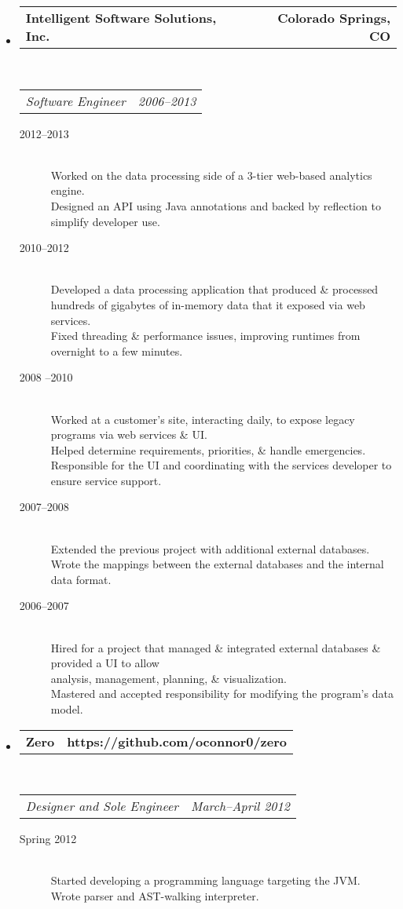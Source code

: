\documentclass[10pt,letterpaper]{article}
\makeatletter
\newcommand{\headerrow}[2]
{\begin{tabular*}{\linewidth}{l@{\extracolsep{\fill}}r}
  #1 &
  #2 \\
\end{tabular*}}
\makeatother
\begin{document}
\begin{itemize}
  \item
  \headerrow
    {\textbf{Intelligent Software Solutions, Inc.}}
    {\textbf{Colorado Springs, CO}}
  \\
  \headerrow
    {\emph{Software Engineer}}
    {\emph{2006--2013}}
  \begin{description}
    \item[2012--2013] \hfill \\
        Worked on the data processing side of a 3-tier web-based analytics engine. \\
        Designed an API using Java annotations and backed by reflection to simplify developer use.
    \item[2010--2012] \hfill \\
        Developed a data processing application that produced \& processed hundreds of gigabytes of in-memory data that it exposed via web services. \\
        Fixed threading \& performance issues, improving runtimes from overnight to a few minutes.
    \item[2008 --2010] \hfill \\
        Worked at a customer’s site, interacting daily, to expose legacy programs via web services \& UI. \\
        Helped determine requirements, priorities, \& handle emergencies. \\
        Responsible for the UI and coordinating with the services developer to ensure service support.
    \item[2007--2008] \hfill \\
        Extended the previous project with additional external databases. \\
        Wrote the mappings between the external databases and the internal data format.
    \item[2006--2007] \hfill \\
        Hired for a project that managed \& integrated external databases \& provided a UI to allow \\ analysis, management, planning, \& visualization. \\
        Mastered and accepted responsibility for modifying the program’s data model.
  \end{description}

  \item
  \headerrow
    {\textbf{Zero}}
    {\textbf{https://github.com/oconnor0/zero}}
  \\
  \headerrow
    {\emph{Designer and Sole Engineer}}
    {\emph{March--April 2012}}
  \begin{description}
    \item[Spring 2012] \hfill \\
      Started developing a programming language targeting the JVM. \\
      Wrote parser and AST-walking interpreter.
   \end{description}


\end{itemize}
\end{document}
